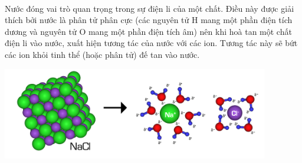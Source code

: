 \begin{hopvidu}
	\\
	Nước đóng vai trò quan trọng trong sự điện li của một chất. Điều này được giải thích bởi nước là phân tử phân cực (các nguyên tử H mang một phần điện tích dương và nguyên tử O mang một phần điện tích âm) nên khi hoà tan một chất điện li vào nước, xuất hiện tương tác của nước với các ion. Tương tác này sẽ bứt các ion khỏi tinh thể (hoặc phân tử) đế tan vào nước.
	\begin{center}
		\includegraphics[height=4cm]{Images/anhhoa11/hoatanNaCl_2.jpg}
	\end{center}
\end{hopvidu}
